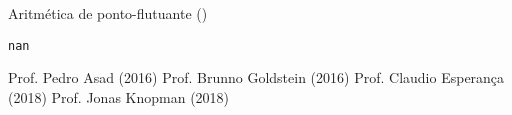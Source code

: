 \documentclass[12pt]{article}
\begin{document}
	\begin{interlude}{Aritmética de ponto-flutuante ()}
	
	\end{interlude}
	
	
	
	
	\begin{interlude}{\texttt{nan}}
	
	\end{interlude}
	
	
	\begin{thebibliography}{99}
	 Prof. Pedro Asad (2016)
	 Prof. Brunno Goldstein (2016)
	 Prof. Claudio Esperança (2018)
	 Prof. Jonas Knopman (2018)
	\end{thebibliography}
\end{document}
